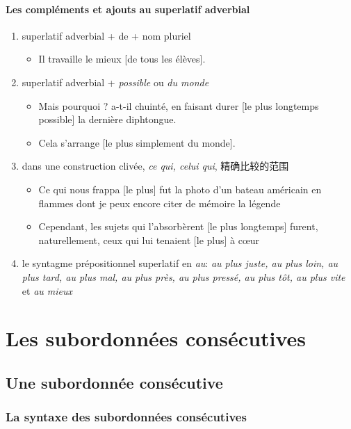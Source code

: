 \documentclass[UTF8]{report}
\begin{document}
\paragraph{Les compléments et ajouts au superlatif adverbial}
\begin{enumerate}
    \item superlatif adverbial + de + nom pluriel
    \begin{itemize}
        \item Il travaille le mieux [de tous les élèves].
    \end{itemize}
    \item superlatif adverbial + \textit{possible} ou \textit{du monde }
    \begin{itemize}
        \item Mais pourquoi ? a-t-il chuinté, en faisant durer [le plus longtemps possible] la dernière diphtongue.
        \item Cela s’arrange [le plus simplement du monde].
    \end{itemize}
    \item dans une construction clivée, \textit{ce qui, celui qui}, 精确比较的范围
    \begin{itemize}
        \item Ce qui nous frappa [le plus] fut la photo d’un bateau américain en flammes dont je peux encore citer de mémoire la légende 
        \item Cependant, les sujets qui l’absorbèrent [le plus longtemps] furent, naturellement, ceux qui lui tenaient [le plus] à cœur
    \end{itemize}
    \item le syntagme prépositionnel superlatif en \textit{au}: \textit{au plus juste, au plus loin, au plus tard, au plus mal, au plus près, au plus pressé, au plus tôt, au plus vite} et \textit{au mieux}
\end{enumerate}


\section{Les subordonnées consécutives}
\subsection{Une subordonnée consécutive}
\subsubsection{La syntaxe des subordonnées consécutives}
\end{document}
